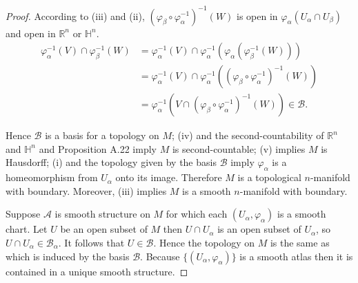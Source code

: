 \begin{proof}
    According to (iii) and (ii), \( {(\varphi_{\beta} \circ \varphi_{\alpha}^{-1})}^{-1}(W) \) is open in \( \varphi_{\alpha}(U_{\alpha} \cap U_{\beta}) \) and open in \( \mathbb{R}^{n} \) or \( \mathbb{H}^{n} \).
    \begingroup
    \allowdisplaybreaks%
    \begin{align*}
        \varphi_{\alpha}^{-1}(V) \cap \varphi_{\beta}^{-1}(W) & = \varphi_{\alpha}^{-1}(V) \cap \varphi_{\alpha}^{-1}(\varphi_{\alpha}(\varphi_{\beta}^{-1}(W)))               \\
                                                              & = \varphi_{\alpha}^{-1}(V) \cap \varphi_{\alpha}^{-1}({(\varphi_{\beta} \circ \varphi_{\alpha}^{-1})}^{-1}(W)) \\
                                                              & = \varphi_{\alpha}^{-1}(V \cap {(\varphi_{\beta} \circ \varphi_{\alpha}^{-1})}^{-1}(W)) \in \mathcal{B}.
    \end{align*}
    \endgroup

    Hence \( \mathcal{B} \) is a basis for a topology on \( M \); (iv) and the second-countability of \( \mathbb{R}^{n} \) and \( \mathbb{H}^{n} \) and Proposition A.22 imply \( M \) is second-countable; (v) implies \( M \) is Hausdorff; (i) and the topology given by the basis \( \mathcal{B} \) imply \( \varphi_{\alpha} \) is a homeomorphism from \( U_{\alpha} \) onto its image. Therefore \( M \) is a topological \( n \)-manifold with boundary. Moreover, (iii) implies \( M \) is a smooth \(n\)-manifold with boundary.

    Suppose \( \mathcal{A} \) is smooth structure on \( M \) for which each \( (U_{\alpha}, \varphi_{\alpha}) \) is a smooth chart. Let \( U \) be an open subset of \( M \) then \( U \cap U_{\alpha} \) is an open subset of \( U_{\alpha} \), so \( U \cap U_{\alpha} \in \mathcal{B}_{\alpha} \). It follows that \( U \in \mathcal{B} \). Hence the topology on \( M \) is the same as which is induced by the basis \( \mathcal{B} \). Because \( \{(U_{\alpha}, \varphi_{\alpha})\} \) is a smooth atlas then it is contained in a unique smooth structure.
\end{proof}

